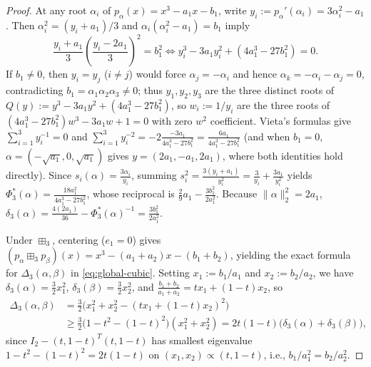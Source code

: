 \documentclass[11pt,a4paper]{article}
\theoremstyle{definition}
\begin{document}
\begin{proof}
At any root $\alpha_i$ of $p_\alpha(x) = x^3 - a_1 x - b_1$, write $y_i := p_\alpha'(\alpha_i) = 3\alpha_i^2 - a_1$. Then $\alpha_i^2 = (y_i + a_1)/3$ and $\alpha_i(\alpha_i^2 - a_1) = b_1$ imply
\[
\frac{y_i + a_1}{3}\left(\frac{y_i - 2a_1}{3}\right)^2 = b_1^2 \iff y_i^3 - 3a_1 y_i^2 + (4a_1^3 - 27 b_1^2) = 0.
\]
If $b_1 \neq 0$, then $y_i = y_j$ ($i \neq j$) would force $\alpha_j = -\alpha_i$ and hence $\alpha_k = -\alpha_i - \alpha_j = 0$, contradicting $b_1 = \alpha_1\alpha_2\alpha_3 \neq 0$; thus $y_1, y_2, y_3$ are the three distinct roots of $Q(y) := y^3 - 3a_1 y^2 + (4a_1^3 - 27 b_1^2)$, so $w_i := 1/y_i$ are the three roots of $(4a_1^3 - 27b_1^2)w^3 - 3a_1 w + 1 = 0$ with zero $w^2$ coefficient. Vieta's formulas give $\sum_{i=1}^3 y_i^{-1} = 0$ and $\sum_{i=1}^3 y_i^{-2} = -2\frac{-3a_1}{4a_1^3 - 27b_1^2} = \frac{6a_1}{4a_1^3 - 27b_1^2}$ (and when $b_1 = 0$, $\alpha = (-\sqrt{a_1}, 0, \sqrt{a_1})$ gives $y = (2a_1, -a_1, 2a_1)$, where both identities hold directly). Since $s_i(\alpha) = \frac{3\alpha_i}{y_i}$, summing $s_i^2 = \frac{3(y_i + a_1)}{y_i^2} = \frac{3}{y_i} + \frac{3a_1}{y_i^2}$ yields $\Phi_3^*(\alpha) = \frac{18 a_1^2}{4a_1^3 - 27b_1^2}$, whose reciprocal is $\frac{2}{9}a_1 - \frac{3b_1^2}{2a_1^2}$. Because $\|\alpha\|_2^2 = 2a_1$, $\delta_3(\alpha) = \frac{4(2a_1)}{36} - \Phi_3^*(\alpha)^{-1} = \frac{3 b_1^2}{2a_1^2}$.

Under $\boxplus_3$, centering ($e_1 = 0$) gives $(p_\alpha \boxplus_3 p_\beta)(x) = x^3 - (a_1+a_2)x - (b_1+b_2)$, yielding the exact formula for $\Delta_3(\alpha,\beta)$ in \eqref{eq:global-cubic}. Setting $x_1 := b_1/a_1$ and $x_2 := b_2/a_2$, we have $\delta_3(\alpha) = \frac{3}{2}x_1^2$, $\delta_3(\beta) = \frac{3}{2}x_2^2$, and $\frac{b_1+b_2}{a_1+a_2} = t x_1 + (1-t) x_2$, so
\begin{align*}
\Delta_3(\alpha,\beta)
&= \frac{3}{2}\Big(x_1^2 + x_2^2 - (t x_1 + (1-t)x_2)^2\Big) \\
&\ge \frac{3}{2}\big(1 - t^2 - (1-t)^2\big)(x_1^2 + x_2^2) = 2t(1-t)\big(\delta_3(\alpha)+\delta_3(\beta)\big),
\end{align*}
since $I_2 - (t,1-t)^T(t,1-t)$ has smallest eigenvalue $1 - t^2 - (1-t)^2 = 2t(1-t)$ on $(x_1, x_2) \propto (t, 1-t)$, i.e., $b_1/a_1^2 = b_2/a_2^2$.
\end{proof}
\end{document}
